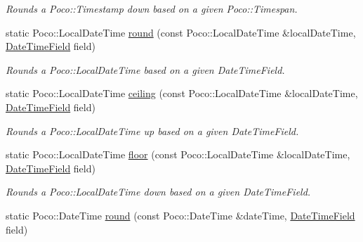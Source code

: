 \begin{DoxyCompactItemize}
\begin{DoxyCompactList}\small\item\em Rounds a Poco\-::\-Timestamp down based on a given Poco\-::\-Timespan. \end{DoxyCompactList}\item 
\hypertarget{classofx_1_1_time_1_1_utils_a46b9183851661ffd3b8c986edb768d70}{static Poco\-::\-Local\-Date\-Time \hyperlink{classofx_1_1_time_1_1_utils_a46b9183851661ffd3b8c986edb768d70}{round} (const Poco\-::\-Local\-Date\-Time \&local\-Date\-Time, \hyperlink{classofx_1_1_time_1_1_utils_aaab0e5bd305761231f063a0701785112}{Date\-Time\-Field} field)}\label{classofx_1_1_time_1_1_utils_a46b9183851661ffd3b8c986edb768d70}

\begin{DoxyCompactList}\small\item\em Rounds a Poco\-::\-Local\-Date\-Time based on a given Date\-Time\-Field. \end{DoxyCompactList}\item 
\hypertarget{classofx_1_1_time_1_1_utils_abe2a0f4939d2f2dbec1e32b65d53703c}{static Poco\-::\-Local\-Date\-Time \hyperlink{classofx_1_1_time_1_1_utils_abe2a0f4939d2f2dbec1e32b65d53703c}{ceiling} (const Poco\-::\-Local\-Date\-Time \&local\-Date\-Time, \hyperlink{classofx_1_1_time_1_1_utils_aaab0e5bd305761231f063a0701785112}{Date\-Time\-Field} field)}\label{classofx_1_1_time_1_1_utils_abe2a0f4939d2f2dbec1e32b65d53703c}

\begin{DoxyCompactList}\small\item\em Rounds a Poco\-::\-Local\-Date\-Time up based on a given Date\-Time\-Field. \end{DoxyCompactList}\item 
\hypertarget{classofx_1_1_time_1_1_utils_a86b2329f6c9e8c8c60294bc502d93804}{static Poco\-::\-Local\-Date\-Time \hyperlink{classofx_1_1_time_1_1_utils_a86b2329f6c9e8c8c60294bc502d93804}{floor} (const Poco\-::\-Local\-Date\-Time \&local\-Date\-Time, \hyperlink{classofx_1_1_time_1_1_utils_aaab0e5bd305761231f063a0701785112}{Date\-Time\-Field} field)}\label{classofx_1_1_time_1_1_utils_a86b2329f6c9e8c8c60294bc502d93804}

\begin{DoxyCompactList}\small\item\em Rounds a Poco\-::\-Local\-Date\-Time down based on a given Date\-Time\-Field. \end{DoxyCompactList}\item 
\hypertarget{classofx_1_1_time_1_1_utils_a8fedb54f4e8a43405dca7c56ba49798f}{static Poco\-::\-Date\-Time \hyperlink{classofx_1_1_time_1_1_utils_a8fedb54f4e8a43405dca7c56ba49798f}{round} (const Poco\-::\-Date\-Time \&date\-Time, \hyperlink{classofx_1_1_time_1_1_utils_aaab0e5bd305761231f063a0701785112}{Date\-Time\-Field} field)}\label{classofx_1_1_time_1_1_utils_a8fedb54f4e8a43405dca7c56ba49798f}


\end{DoxyCompactItemize}
